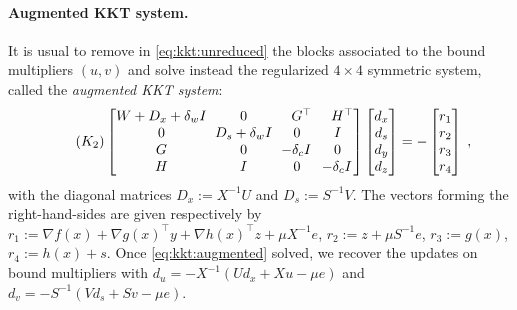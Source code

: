 \paragraph{Augmented KKT system.}
It is usual to remove in \eqref{eq:kkt:unreduced} the blocks associated
to the bound multipliers $(u, v)$ and solve instead the regularized
$4 \times 4$ symmetric system, called the \emph{augmented KKT system}:
\begin{equation}
  \label{eq:kkt:augmented}
  \tag{$K_2$}
  \setlength\arraycolsep{3pt}
  \begin{bmatrix}
    W + D_x + \delta_w I & 0   & \phantom{-}G^\top           & \phantom{-}H^\top           \\
      0       & D_s + \delta_w I  & \phantom{-}0\phantom{^\top} & \phantom{-}I\phantom{^\top} \\
      G       & 0   & -\delta_c I  & \phantom{-}0\phantom{^\top} \\
    H       & I   & \phantom{-}0\phantom{^\top} & -\delta_c I
  \end{bmatrix}
  \begin{bmatrix}
    d_x \\
    d_s \\
    d_y \\
    d_z
  \end{bmatrix}
  = - \begin{bmatrix}
    r_1 \\ r_2 \\ r_3 \\ r_4
  \end{bmatrix} \; ,
\end{equation}
with the diagonal matrices $D_x := X^{-1} U$ and $D_s := S^{-1} V$.
The vectors forming the right-hand-sides are given respectively by
$r_1 := \nabla f(x) + \nabla g(x)^\top y + \nabla h(x)^\top z + \mu X^{-1} e$,
$r_2 := z + \mu S^{-1} e$,
$r_3 := g(x)$,
$r_4 := h(x) + s$.
Once \eqref{eq:kkt:augmented} solved, we recover the updates on bound multipliers with
$d_u = - X^{-1}(U d_x + X u - \mu e)$ and
$d_v = - S^{-1}(V d_s + S v - \mu e)$.

